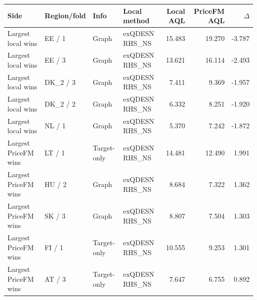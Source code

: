 \begin{tabular}{llllrrr}
\toprule
Side & Region/fold & Info & Local method & Local AQL & PriceFM AQL & $\Delta$ \\
\midrule
Largest local wins & EE / 1 & Graph & exQDESN RHS\_NS & 15.483 & 19.270 & -3.787 \\
Largest local wins & EE / 3 & Graph & exQDESN RHS\_NS & 13.621 & 16.114 & -2.493 \\
Largest local wins & DK\_2 / 3 & Graph & exQDESN RHS\_NS & 7.411 & 9.369 & -1.957 \\
Largest local wins & DK\_2 / 2 & Graph & exQDESN RHS\_NS & 6.332 & 8.251 & -1.920 \\
Largest local wins & NL / 1 & Graph & exQDESN RHS\_NS & 5.370 & 7.242 & -1.872 \\
Largest PriceFM wins & LT / 1 & Target-only & exQDESN RHS\_NS & 14.481 & 12.490 & 1.991 \\
Largest PriceFM wins & HU / 2 & Graph & exQDESN RHS\_NS & 8.684 & 7.322 & 1.362 \\
Largest PriceFM wins & SK / 3 & Graph & exQDESN RHS\_NS & 8.807 & 7.504 & 1.303 \\
Largest PriceFM wins & FI / 1 & Target-only & exQDESN RHS\_NS & 10.555 & 9.253 & 1.301 \\
Largest PriceFM wins & AT / 3 & Target-only & exQDESN RHS\_NS & 7.647 & 6.755 & 0.892 \\
\bottomrule
\end{tabular}
